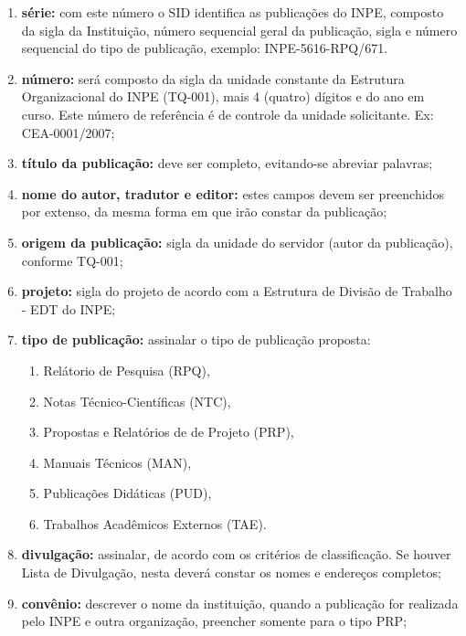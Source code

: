 \begin{enumerate}

 \item \textbf{série:} com este número o SID identifica as publicações do INPE, composto da sigla da Instituição, número sequencial geral da publicação, sigla e número sequencial do tipo de publicação, exemplo: INPE-5616-RPQ/671. 
 
 \item \textbf{número:} será composto da sigla da unidade constante da Estrutura Organizacional do INPE (TQ-001), mais 4 (quatro) dígitos e do ano em curso. Este número de referência é de controle da unidade solicitante. Ex: CEA-0001/2007;
 
 \item \textbf{título da publicação:} deve ser completo, evitando-se abreviar palavras;

 \item \textbf{nome do autor, tradutor e editor:}  estes campos devem ser preenchidos por extenso, da mesma forma em que irão constar da publicação;

 \item \textbf{origem da publicação:} sigla da unidade do servidor (autor da publicação), conforme TQ-001;

 \item \textbf{projeto:} sigla do projeto de acordo com a Estrutura de Divisão de Trabalho - EDT do INPE;

 \item \textbf{tipo de publicação:} assinalar o tipo de publicação proposta:

 \begin{enumerate}
  \item{Relátorio de Pesquisa (RPQ)},
  \item{Notas Técnico-Científicas (NTC)},
  \item{Propostas e Relatórios de de Projeto (PRP)},
  \item{Manuais Técnicos (MAN)},
  \item{Publicações Didáticas (PUD)},
  \item{Trabalhos Acadêmicos Externos (TAE)}.
 \end{enumerate}

 \item \textbf{divulgação:} assinalar, de acordo com os critérios de classificação. Se houver Lista de Divulgação, nesta deverá constar os nomes e endereços completos;

 \item \textbf{convênio:} descrever o nome da instituição, quando a publicação for realizada pelo INPE e outra organização, preencher somente para o tipo PRP; 
 

\end{enumerate}
